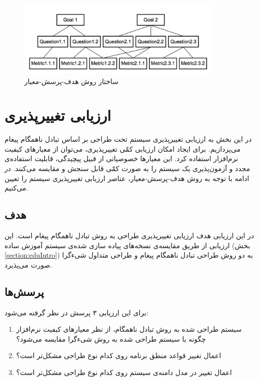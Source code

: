 \begin{figure}[htb]
    \begin{center}
	\includegraphics[width=10cm]{5-Evaluation/Figures/gqm.pdf}
    \end{center}
    \caption{\label{fig:gqm} ساختار روش هدف-پرسش-معیار }
\end{figure}

\section{ارزیابی تغییرپذیری}
در این بخش به ارزیابی تغییرپذیری سیستم تحت طراحی بر اساس تبادل ناهمگام پیغام می‌پردازیم. برای ایجاد امکان ارزیابی کمّی تغییرپذیری، می‌توان از معیارهای کیفیت نرم‌افزار استفاده کرد. این معیارها خصوصیاتی از قبیل پیچیدگی، قابلیت استفاده‌ی مجدد و آزمون‌پذیری یک سیستم را به صورت کمّی قابل سنجش و مقایسه می‌کنند. در ادامه با توجه به روش هدف-پرسش-معیار، عناصر ارزیابی تغییرپذیری سیستم را تعیین می‌کنیم.

\subsection{هدف}
در این ارزیابی هدف ارزیابی تغییرپذیری طراحی به روش تبادل ناهمگام پیغام است. این ارزیابی از طریق مقایسه‌ی نسخه‌های پیاده سازی شده‌ی سیستم آموزش ساده (بخش \ref{section:eduIntro}) به دو روش طراحی تبادل ناهمگام پیغام و طراحی متداول شیءگرا صورت می‌پذیرد.

\subsection{پرسش‌ها}
برای این ارزیابی ۳ پرسش در نظر گرفته می‌شود:
\begin{enumerate}
\item سیستم طراحی شده به روش تبادل ناهمگام، از نظر معیارهای کیفیت نرم‌افزار چگونه با سیستم طراحی شده به روش شیءگرا مقایسه می‌شود؟
\item اعمال تغییر قواعد منطق برنامه روی کدام نوع طراحی مشکل‌تر است؟ 
\item اعمال تغییر در مدل دامنه‌ی سیستم روی کدام نوع طراحی مشکل‌تر است؟ 
\end{enumerate}

